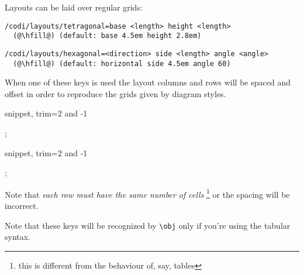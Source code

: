 Layouts can be laid over regular grids:

\begin{lstlisting}[style=metacode]
/codi/layouts/tetragonal=base <length> height <length>
  (@\hfill@) (default: base 4.5em height 2.8em)
\end{lstlisting}

\begin{lstlisting}[style=metacode]
/codi/layouts/hexagonal=<direction> side <length> angle <angle>
  (@\hfill@) (default: horizontal side 4.5em angle 60)
\end{lstlisting}

When one of these keys is used the layout columns and rows will be
spaced and offset in order to reproduce the grids given by diagram styles.

\begin{tcblisting}{snippet, trim={2 and -1}}
\begin{codi}
  ;
\end{codi}
\end{tcblisting}

\begin{tcblisting}{snippet, trim={2 and -1}}
\begin{codi}
  ;
\end{codi}
\end{tcblisting}

Note that \emph{each row must have the same number of cells}%
\footnote{this is different from the behaviour of, say, tables}
or the spacing will be incorrect.

Note that these keys will be recognized by \lstinline|\obj| only if you're using the tabular syntax.
